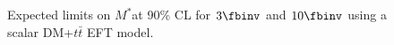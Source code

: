\begin{figure}[h]
  \centering
  \caption{\label{fig:DMtt_EFT_limit} Expected limits on $M^*$at 90\% CL for $3\fbinv$ and $10\fbinv$ using a scalar DM+$t\bar{t}$ EFT model. }
\end{figure}


